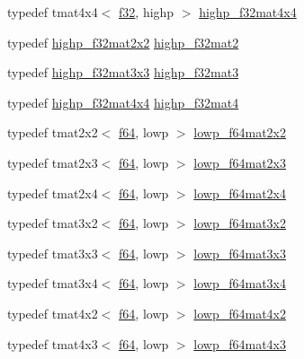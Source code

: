 \begin{DoxyCompactItemize}
\item 
typedef tmat4x4$<$ \hyperlink{group__gtc__type__precision_ga0ec999b57f5330d9021256e96038df04}{f32}, highp $>$ \hyperlink{namespaceglm_a843cbcb73e74d599cdbadc97d0478539}{highp\+\_\+f32mat4x4}
\item 
typedef \hyperlink{namespaceglm_ab78dad85a95f5fcf418769d76c8fbad1}{highp\+\_\+f32mat2x2} \hyperlink{namespaceglm_aed934f561aaf8ad891c0a8f5e719aea8}{highp\+\_\+f32mat2}
\item 
typedef \hyperlink{namespaceglm_a54f70d88a2ef282af2dd5750f518645d}{highp\+\_\+f32mat3x3} \hyperlink{namespaceglm_a06809818db73785334f839742a9ad85a}{highp\+\_\+f32mat3}
\item 
typedef \hyperlink{namespaceglm_a843cbcb73e74d599cdbadc97d0478539}{highp\+\_\+f32mat4x4} \hyperlink{namespaceglm_ac14c1bfb647e39d459c7489ede2156cc}{highp\+\_\+f32mat4}
\item 
typedef tmat2x2$<$ \hyperlink{group__gtc__type__precision_ga2bba392e555124b36cde6abba349bab3}{f64}, lowp $>$ \hyperlink{namespaceglm_aa0842065affce367ff31e0d9af433c3d}{lowp\+\_\+f64mat2x2}
\item 
typedef tmat2x3$<$ \hyperlink{group__gtc__type__precision_ga2bba392e555124b36cde6abba349bab3}{f64}, lowp $>$ \hyperlink{namespaceglm_a9ac05a44a0c0578915e80a0ca43f2b46}{lowp\+\_\+f64mat2x3}
\item 
typedef tmat2x4$<$ \hyperlink{group__gtc__type__precision_ga2bba392e555124b36cde6abba349bab3}{f64}, lowp $>$ \hyperlink{namespaceglm_ada6da92233bccc6b7b1089d25a29a62b}{lowp\+\_\+f64mat2x4}
\item 
typedef tmat3x2$<$ \hyperlink{group__gtc__type__precision_ga2bba392e555124b36cde6abba349bab3}{f64}, lowp $>$ \hyperlink{namespaceglm_abf4affc88961615eb9a7f3fab56f27c7}{lowp\+\_\+f64mat3x2}
\item 
typedef tmat3x3$<$ \hyperlink{group__gtc__type__precision_ga2bba392e555124b36cde6abba349bab3}{f64}, lowp $>$ \hyperlink{namespaceglm_a6367c3751539aea4009d60450f059189}{lowp\+\_\+f64mat3x3}
\item 
typedef tmat3x4$<$ \hyperlink{group__gtc__type__precision_ga2bba392e555124b36cde6abba349bab3}{f64}, lowp $>$ \hyperlink{namespaceglm_a741631f3eea564b862ca47d3e99b4481}{lowp\+\_\+f64mat3x4}
\item 
typedef tmat4x2$<$ \hyperlink{group__gtc__type__precision_ga2bba392e555124b36cde6abba349bab3}{f64}, lowp $>$ \hyperlink{namespaceglm_a4909d8c3655c44e73c540c65ea476cea}{lowp\+\_\+f64mat4x2}
\item 
typedef tmat4x3$<$ \hyperlink{group__gtc__type__precision_ga2bba392e555124b36cde6abba349bab3}{f64}, lowp $>$ \hyperlink{namespaceglm_a100d1e29c0170af29dd678c0e0587934}{lowp\+\_\+f64mat4x3}

\end{DoxyCompactItemize}
